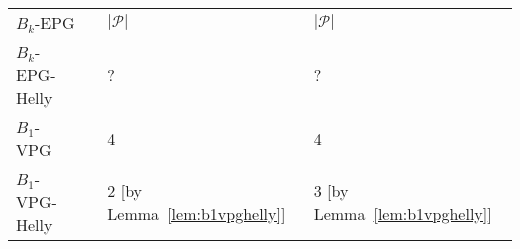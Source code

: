 \begin{table}[htb]
\begin{tabular}{llll}
\cline{1-1} \cline{3-4}
\multicolumn{1}{|l|}{$B_k$-EPG} &
\multicolumn{1}{l|}{} & 
\multicolumn{1}{|l|}{$|\mathcal{P}|$} &
\multicolumn{1}{|l|}{$|\mathcal{P}|$} \\ \cline{1-1} \cline{3-4}
 
 \cline{1-1} \cline{3-4}
\multicolumn{1}{|l|}{$B_k$-EPG-Helly} &
\multicolumn{1}{l|}{} & 
\multicolumn{1}{|l|}{?} &
\multicolumn{1}{|l|}{?} \\ \cline{1-1} \cline{3-4}

 
 \cline{1-1} \cline{3-4}
\multicolumn{1}{|l|}{$B_1$-VPG} &
\multicolumn{1}{l|}{} & 
\multicolumn{1}{|l|}{4 \cite{golumbic2013}} &
\multicolumn{1}{|l|}{4 \cite{golumbic2013}} \\ \cline{1-1} \cline{3-4} 
 
 
 \cline{1-1} \cline{3-4}
\multicolumn{1}{|l|}{$B_1$-VPG-Helly} &
\multicolumn{1}{l|}{} & 
\multicolumn{1}{|l|}{2 [by Lemma~\ref{lem:b1vpghelly}]} &
\multicolumn{1}{|l|}{ 3 [by Lemma~\ref{lem:b1vpghelly}]} \\ \cline{1-1} \cline{3-4}  





\end{tabular}
\end{table}



